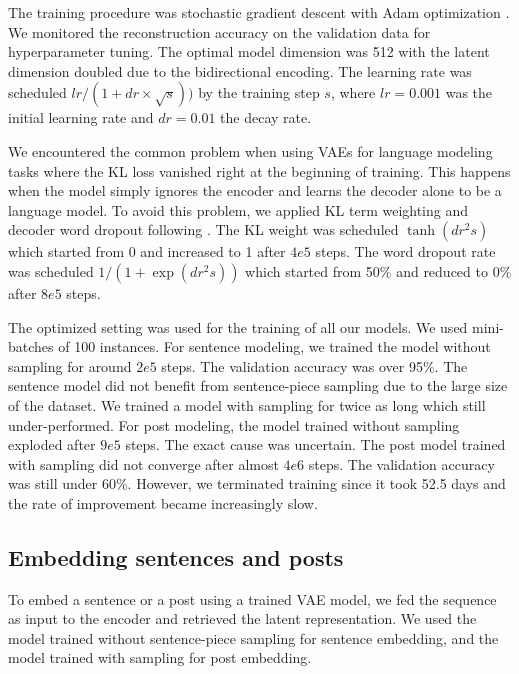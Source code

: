 \documentclass[11pt]{article}
\begin{document}
The training procedure was stochastic gradient descent with Adam optimization \parencite{kingma2014adam}.
We monitored the reconstruction accuracy on the validation data for hyperparameter tuning.
The optimal model dimension was 512 with the latent dimension doubled due to the bidirectional encoding.
The learning rate was scheduled \(lr / \left( 1 + dr \times \sqrt{s} \right))\) by the training step \(s\),
where \(lr = 0.001\) was the initial learning rate
and \(dr = 0.01\) the decay rate.

We encountered the common problem when using VAEs for language modeling tasks
where the KL loss vanished right at the beginning of training.
This happens when the model simply ignores the encoder and learns the decoder alone to be a language model.
To avoid this problem, we applied KL term weighting and decoder word dropout following \textcite{bowman2015generating}.
The KL weight was scheduled \(\tanh( dr^{2} s )\)
which started from 0 and increased to 1 after \(4e5\) steps.
The word dropout rate was scheduled \(1 / \left( 1 + \exp( dr^{2} s ) \right)\)
which started from 50\% and reduced to 0\% after \(8e5\) steps.

The optimized setting was used for the training of all our models.
We used mini-batches of 100 instances.
For sentence modeling,
we trained the model without sampling for around \(2e5\) steps.
The validation accuracy was over 95\%.
The sentence model did not benefit from sentence-piece sampling due to the large size of the dataset.
We trained a model with sampling for twice as long which still under-performed.
For post modeling,
the model trained without sampling exploded after \(9e5\) steps.
The exact cause was uncertain.
The post model trained with sampling did not converge after almost \(4e6\) steps.
The validation accuracy was still under 60\%.
However, we terminated training since it took 52.5 days and the rate of improvement became increasingly slow.

\subsection{Embedding sentences and posts}\label{sec:embedd-sent-posts}

To embed a sentence or a post using a trained VAE model,
we fed the sequence as input to the encoder and retrieved the latent representation.
We used the model trained without sentence-piece sampling for sentence embedding,
and the model trained with sampling for post embedding.
\end{document}
